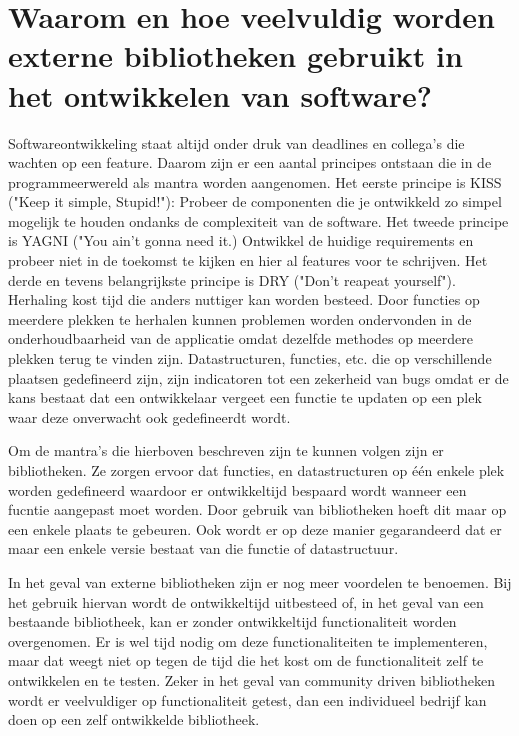 \section{Waarom en hoe veelvuldig worden externe bibliotheken gebruikt in het ontwikkelen van software?}\label{sec:waarom-hoe}
Softwareontwikkeling staat altijd onder druk van deadlines en collega's die wachten op een feature. Daarom zijn er een aantal principes ontstaan die in de programmeerwereld als mantra worden aangenomen. Het eerste principe is KISS ("Keep it simple, Stupid!"): Probeer de componenten die je ontwikkeld zo simpel mogelijk te houden ondanks de complexiteit van de software. Het tweede principe is YAGNI ("You ain't gonna need it.) Ontwikkel de huidige requirements en probeer niet in de toekomst te kijken en hier al features voor te schrijven. Het derde en tevens belangrijkste principe is DRY ("Don't reapeat yourself"). Herhaling kost tijd die anders nuttiger kan worden besteed. Door functies op meerdere plekken te herhalen kunnen problemen worden ondervonden in de onderhoudbaarheid van de applicatie omdat dezelfde methodes op meerdere plekken terug te vinden zijn. Datastructuren, functies, etc. die op verschillende plaatsen gedefineerd zijn, zijn indicatoren tot een zekerheid van bugs omdat er de kans bestaat dat een ontwikkelaar vergeet een functie te updaten op een plek waar deze onverwacht ook gedefineerdt wordt. \citep{uselibs}

Om de mantra's die hierboven beschreven zijn te kunnen volgen zijn er bibliotheken. Ze zorgen ervoor dat functies, en datastructuren op één enkele plek worden gedefineerd waardoor er ontwikkeltijd bespaard wordt wanneer een fucntie aangepast moet worden. Door gebruik van bibliotheken hoeft dit maar op een enkele plaats te gebeuren. Ook wordt er op deze manier gegarandeerd dat er maar een enkele versie bestaat van die functie of datastructuur.

In het geval van externe bibliotheken zijn er nog meer voordelen te benoemen. Bij het gebruik hiervan wordt de ontwikkeltijd uitbesteed of, in het geval van een bestaande bibliotheek, kan er zonder ontwikkeltijd functionaliteit worden overgenomen. Er is wel tijd nodig om deze functionaliteiten te implementeren, maar dat weegt niet op tegen de tijd die het kost om de functionaliteit zelf te ontwikkelen en te testen. Zeker in het geval van community driven bibliotheken wordt er veelvuldiger op functionaliteit getest, dan een individueel bedrijf kan doen op een zelf ontwikkelde bibliotheek.

